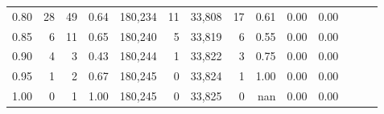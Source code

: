 \begin{tabular}{rrrrrrrrrrrrrr}
0.80 &      28 &     49 &  0.64 &  180,234 &       11 &  33,808 &      17 &  0.61 &  0.00 &      0.00 \\
0.85 &       6 &     11 &  0.65 &  180,240 &        5 &  33,819 &       6 &  0.55 &  0.00 &      0.00 \\
0.90 &       4 &      3 &  0.43 &  180,244 &        1 &  33,822 &       3 &  0.75 &  0.00 &      0.00 \\
0.95 &       1 &      2 &  0.67 &  180,245 &        0 &  33,824 &       1 &  1.00 &  0.00 &      0.00 \\
1.00 &       0 &      1 &  1.00 &  180,245 &        0 &  33,825 &       0 &   nan &  0.00 &      0.00 \\
\bottomrule
\end{tabular}
